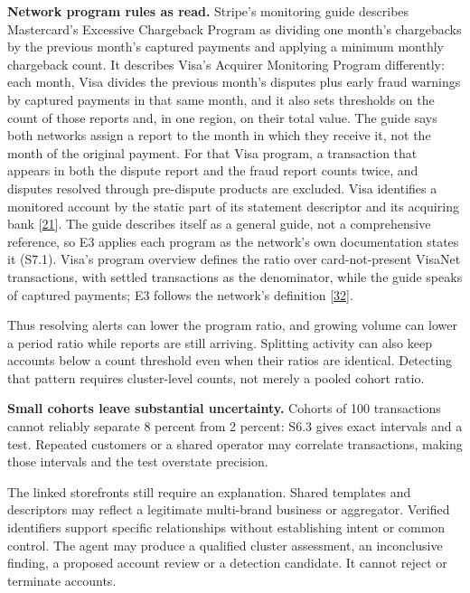 \documentclass[
  11pt,
]{article}
\begin{document}
\textbf{Network program rules as read.} Stripe's monitoring guide
describes Mastercard's Excessive Chargeback Program as dividing one
month's chargebacks by the previous month's captured payments and
applying a minimum monthly chargeback count. It describes Visa's
Acquirer Monitoring Program differently: each month, Visa divides the
previous month's disputes plus early fraud warnings by captured payments
in that same month, and it also sets thresholds on the count of those
reports and, in one region, on their total value. The guide says both
networks assign a report to the month in which they receive it, not the
month of the original payment. For that Visa program, a transaction that
appears in both the dispute report and the fraud report counts twice,
and disputes resolved through pre-dispute products are excluded. Visa
identifies a monitored account by the static part of its statement
descriptor and its acquiring bank
{[}\protect\hyperlink{ref-Stripe2026MonitoringPrograms}{21}{]}. The
guide describes itself as a general guide, not a comprehensive
reference, so E3 applies each program as the network's own documentation
states it (S7.1). Visa's program overview defines the ratio over
card-not-present VisaNet transactions, with settled transactions as the
denominator, while the guide speaks of captured payments; E3 follows the
network's definition {[}\protect\hyperlink{ref-Visa2025VAMP}{32}{]}.

Thus resolving alerts can lower the program ratio, and growing volume
can lower a period ratio while reports are still arriving. Splitting
activity can also keep accounts below a count threshold even when their
ratios are identical. Detecting that pattern requires cluster-level
counts, not merely a pooled cohort ratio.

\textbf{Small cohorts leave substantial uncertainty.} Cohorts of 100
transactions cannot reliably separate 8 percent from 2 percent: S6.3
gives exact intervals and a test. Repeated customers or a shared
operator may correlate transactions, making those intervals and the test
overstate precision.

The linked storefronts still require an explanation. Shared templates
and descriptors may reflect a legitimate multi-brand business or
aggregator. Verified identifiers support specific relationships without
establishing intent or common control. The agent may produce a qualified
cluster assessment, an inconclusive finding, a proposed account review
or a detection candidate. It cannot reject or terminate accounts.
\end{document}
